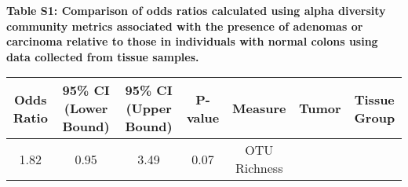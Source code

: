 \documentclass[12pt,]{article}
\title{}
\author{}
\date{}
\begin{document}

\textbf{Table S1: Comparison of odds ratios calculated using alpha
diversity community metrics associated with the presence of adenomas or
carcinoma relative to those in individuals with normal colons using data
collected from tissue samples.}

\footnotesize

\begin{longtable}[]{@{}ccccccc@{}}
\toprule
\begin{minipage}[b]{0.09\columnwidth}\centering\strut
Odds Ratio\strut
\end{minipage} & \begin{minipage}[b]{0.16\columnwidth}\centering\strut
95\% CI (Lower Bound)\strut
\end{minipage} & \begin{minipage}[b]{0.16\columnwidth}\centering\strut
95\% CI (Upper Bound)\strut
\end{minipage} & \begin{minipage}[b]{0.07\columnwidth}\centering\strut
P-value\strut
\end{minipage} & \begin{minipage}[b]{0.14\columnwidth}\centering\strut
Measure\strut
\end{minipage} & \begin{minipage}[b]{0.09\columnwidth}\centering\strut
Tumor\strut
\end{minipage} & \begin{minipage}[b]{0.11\columnwidth}\centering\strut
Tissue Group\strut
\end{minipage}\tabularnewline
\midrule
\endhead
\begin{minipage}[t]{0.09\columnwidth}\centering\strut
1.82\strut
\end{minipage} & \begin{minipage}[t]{0.16\columnwidth}\centering\strut
0.95\strut
\end{minipage} & \begin{minipage}[t]{0.16\columnwidth}\centering\strut
3.49\strut
\end{minipage} & \begin{minipage}[t]{0.07\columnwidth}\centering\strut
0.07\strut
\end{minipage} & \begin{minipage}[t]{0.14\columnwidth}\centering\strut
OTU Richness\strut
\end{minipage} & \begin{minipage}[t]{0.09\columnwidth}\centering\strut

\end{minipage}
\end{longtable}
\end{document}
